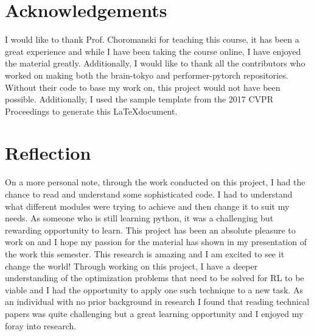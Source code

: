 \documentclass[10pt,twocolumn,letterpaper]{article}
\begin{document}
\section{Acknowledgements}
I would like to thank Prof. Choromanski for teaching this course, it has been a 
great experience and while I have been taking the course online, I have enjoyed 
the material greatly. Additionally, I would like to thank all the contributors who 
worked on making both the brain-tokyo and performer-pytorch repositories. Without their
code to base my work on, this project would not have been possible. Additionally, I 
used the sample template from the 2017 CVPR Proceedings to generate this \LaTeX document.

\section{Reflection}
On a more personal note, through the work conducted on this project, I had the 
chance to read and understand some sophisticated code. I had to understand what 
different modules were trying to achieve  and then change it to suit my needs. As 
someone who is still learning python, it was a challenging but rewarding opportunity to 
learn. This project has been an absolute pleasure to work on
and I hope my passion for the material has shown in my presentation of the work this
semester. This research is amazing and I am excited to see it change the world!
Through working on this project, I have a deeper understanding of the 
optimization problems that need to be solved for RL to be viable and I had the
opportunity to apply one such technique to a new task. As an individual with no
prior background in research I found that reading technical papers was quite challenging 
but a great learning opportunity and I enjoyed my foray into research.

{\small
    
    
}
\end{document}
